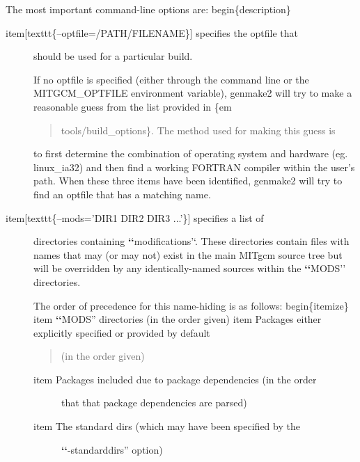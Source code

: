 \documentclass[letterpaper,10pt,english]{sphinxmanual}
\begin{document}
The most important command-line options are:
begin\{description\}
\begin{description}
\item[{item{[}texttt\{--optfile=/PATH/FILENAME\}{]} specifies the optfile that}] \leavevmode
should be used for a particular build.

If no \sphinxquotedblleft{}optfile\sphinxquotedblright{} is specified (either through the command line or the
MITGCM\_OPTFILE environment variable), genmake2 will try to make a
reasonable guess from the list provided in \{em
\begin{quote}

tools/build\_options\}.  The method used for making this guess is
\end{quote}

to first determine the combination of operating system and hardware
(eg. \sphinxquotedblleft{}linux\_ia32\sphinxquotedblright{}) and then find a working FORTRAN compiler within
the user's path.  When these three items have been identified,
genmake2 will try to find an optfile that has a matching name.

\item[{item{[}texttt\{--mods='DIR1 DIR2 DIR3 ...'\}{]} specifies a list of}] \leavevmode
directories containing {\color{red}\bfseries{}{}`{}`}modifications'`.  These directories contain
files with names that may (or may not) exist in the main MITgcm
source tree but will be overridden by any identically-named sources
within the {\color{red}\bfseries{}{}`{}`}MODS'' directories.

The order of precedence for this \sphinxquotedblleft{}name-hiding\sphinxquotedblright{} is as follows:
begin\{itemize\}
item {\color{red}\bfseries{}{}`{}`}MODS'' directories (in the order given)
item Packages either explicitly specified or provided by default
\begin{quote}

(in the order given)
\end{quote}
\begin{description}
\item[{item Packages included due to package dependencies (in the order}] \leavevmode
that that package dependencies are parsed)

\item[{item The \sphinxquotedblleft{}standard dirs\sphinxquotedblright{} (which may have been specified by the}] \leavevmode
{\color{red}\bfseries{}{}`{}`}-standarddirs'' option)

\end{description}


\end{description}
\end{document}
